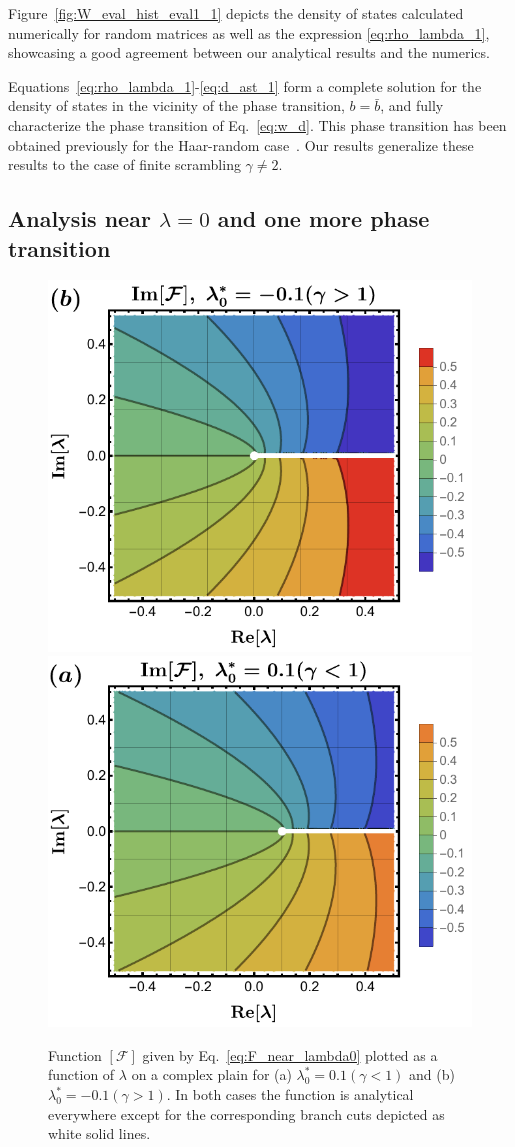 \documentclass[%
 reprint,
 superscriptaddress,
 amsmath,amssymb,
prx,
]{revtex4-2}\href{\href{}{}}{}
\begin{document}
Figure~\ref{fig:W_eval_hist_eval1_1} depicts the density of states calculated numerically for random matrices as well as the expression \eqref{eq:rho_lambda_1}, showcasing a good agreement between our analytical results and the numerics.

Equations~\eqref{eq:rho_lambda_1}-\eqref{eq:d_ast_1} form a complete solution for the density of states in the vicinity of the phase transition, $b=\bar b$, and fully characterize the phase transition of Eq.~\eqref{eq:w_d}.
This phase transition has been obtained previously for the Haar-random case~\cite{Collins2005}.
Our results generalize these results to the case of finite scrambling $\gamma\neq 2$.




\subsection{Analysis near $\lambda=0$ and one more phase transition}

\begin{figure}
	\includegraphics[width = 0.75\columnwidth]{ImFgammal1.pdf}\qquad\qquad\qquad
	\includegraphics[width = 0.75\columnwidth]{ImFgammag1.pdf}
	\caption{Function $[\mathcal{F}]$ given by Eq.~\eqref{eq:F_near_lambda0} plotted as a function of $\lambda$ on a complex plain for (a) $\lambda_0^{\ast}=0.1(\gamma<1)$ and (b) $ \lambda_0^{\ast}=-0.1(\gamma>1)$. In both cases the function is analytical everywhere except for the corresponding branch cuts depicted as white solid lines.}
	\label{fig:F_complex_plain}
\end{figure}
\end{document}
